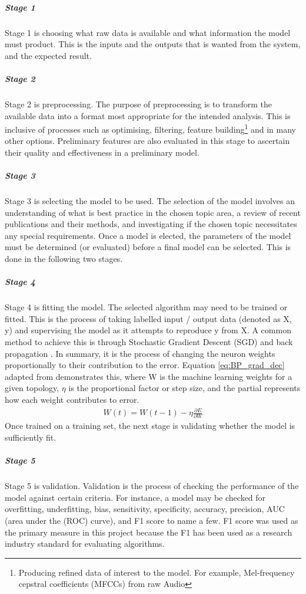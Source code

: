 \documentclass{UoNMCHA}
\newcommand{\eref}[1] {Equation \ref{#1}}
\numberwithin{equation}{section}
\begin{document}
\subparagraph{Stage 1}
Stage 1 is choosing what raw data is available and what information the model must product. This is the inputs and the outputs that is wanted from the system, and the expected result.

\subparagraph{Stage 2}
Stage 2 is preprocessing. The purpose of preprocessing is to transform the available data into a format most appropriate for the intended analysis. This is inclusive of processes such as optimising, filtering, feature building\footnote{Producing refined data of interest to the model. For example, Mel-frequency cepstral coefficients (MFCCs) from raw Audio} and in many other options. Preliminary features are also evaluated in this stage to ascertain their quality and effectiveness in a preliminary model.

\subparagraph{Stage 3}
Stage 3 is selecting the model to be used. The selection of the model involves an understanding of what is best practice in the chosen topic area, a review of recent publications and their methods, and investigating if the chosen topic necessitates any special requirements. Once a model is elected, the parameters of the model must be determined (or evaluated) before a final model can be selected. This is done in the following two stages.

\subparagraph{Stage 4}
Stage 4 is fitting the model. The selected algorithm may need to be trained or fitted. This is the process of taking labelled input / output data (denoted as X, y) and supervising the model as it attempts to reproduce y from X. A common method to achieve this is through Stochastic Gradient Descent (SGD) and back propagation \cite{lecun2012efficient}. In summary, it is the process of changing the neuron weights proportionally to their contribution to the error. \eref{eq:BP_grad_dec} adapted from \cite{lecun2012efficient} demonstrates this, where W is the machine learning weights for a given topology, $\eta$ is the proportional factor or step size, and the partial represents how each weight contributes to error.\\

\begin{gather}\label{eq:BP_grad_dec}
    W(t) = W(t-1) - \eta\frac{\partial E}{\partial W} 
\end{gather}
Once trained on a training set, the next stage is validating whether the model is sufficiently fit.

\subparagraph{Stage 5}
Stage 5 is validation. Validation is the process of checking the performance of the model against certain criteria. For instance, a model may be checked for overfitting, underfitting, bias, sensitivity, specificity, accuracy, precision, AUC (area under the (ROC) curve), and F1 score to name a few. F1 score was used as the primary measure in this project because the F1 has been used as a research industry standard for evaluating algorithms. \\
\end{document}

